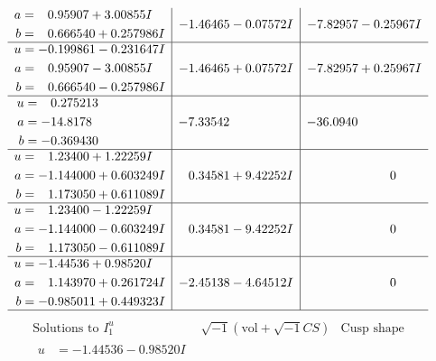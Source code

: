 \documentclass[1p]{elsarticle_modified}
\theoremstyle{definition}
\newcommand{\I}{\sqrt{-1}}
\begin{document}
$$\begin{array}{c|c|c}
\begin{aligned}
a &= \phantom{-}0.95907 + 3.00855 I \\
b &= \phantom{-}0.666540 + 0.257986 I\end{aligned}
 & -1.46465 - 0.07572 I & -7.82957 - 0.25967 I \\ \hline\begin{aligned}
u &= -0.199861 - 0.231647 I \\
a &= \phantom{-}0.95907 - 3.00855 I \\
b &= \phantom{-}0.666540 - 0.257986 I\end{aligned}
 & -1.46465 + 0.07572 I & -7.82957 + 0.25967 I \\ \hline\begin{aligned}
u &= \phantom{-}0.275213\phantom{ +0.000000I} \\
a &= -14.8178\phantom{ +0.000000I} \\
b &= -0.369430\phantom{ +0.000000I}\end{aligned}
 & -7.33542\phantom{ +0.000000I} & -36.0940\phantom{ +0.000000I} \\ \hline\begin{aligned}
u &= \phantom{-}1.23400 + 1.22259 I \\
a &= -1.144000 + 0.603249 I \\
b &= \phantom{-}1.173050 + 0.611089 I\end{aligned}
 & \phantom{-}0.34581 + 9.42252 I & \phantom{-0.000000 } 0 \\ \hline\begin{aligned}
u &= \phantom{-}1.23400 - 1.22259 I \\
a &= -1.144000 - 0.603249 I \\
b &= \phantom{-}1.173050 - 0.611089 I\end{aligned}
 & \phantom{-}0.34581 - 9.42252 I & \phantom{-0.000000 } 0 \\ \hline\begin{aligned}
u &= -1.44536 + 0.98520 I \\
a &= \phantom{-}1.143970 + 0.261724 I \\
b &= -0.985011 + 0.449323 I\end{aligned}
 & -2.45138 - 4.64512 I & \phantom{-0.000000 } 0\\
 \hline 
 \end{array}$$\newpage$$\begin{array}{c|c|c}  
\text{Solutions to }I^u_{1}& \I (\text{vol} + \sqrt{-1}CS) & \text{Cusp shape}\\
 \hline 
\begin{aligned}
u &= -1.44536 - 0.98520 I \\

\end{aligned}
\end{array}$$
\end{document}
